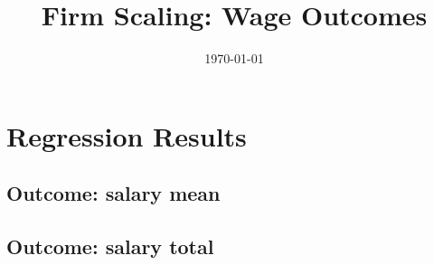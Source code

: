 \documentclass[11pt]{article}
\title{Firm Scaling: Wage Outcomes}
\date{\today}
\author{}
\begin{document}
\maketitle

\section*{Regression Results}
\begin{small}
\subsection*{Outcome: salary mean}

\medskip
\subsection*{Outcome: salary total}

\end{small}
\end{document}
